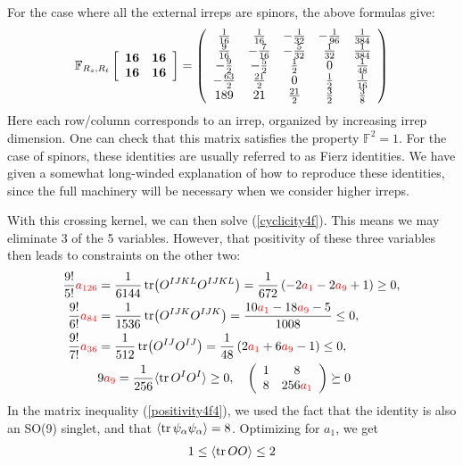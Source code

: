 \documentclass[11pt]{article}
\def\nref#1{(\ref{#1})}
\renewcommand{\ev}[1]{\langle #1 \rangle} %
\def\red{\color{red}}
\begin{document}
For the case where all the external irreps are spinors, the above formulas give: %
\begin{align}
  \mathbb{F}_{R_s, R_t}\left[\begin{array}{ll}
{\bf 16} & {\bf 16} \\
{\bf 16} & {\bf 16}
\end{array}\right] = \left(
\begin{array}{ccccc}
 \frac{1}{16} & \frac{1}{16} & -\frac{1}{32} & -\frac{1}{96} & \frac{1}{384} \\
 \frac{9}{16} & -\frac{7}{16} & -\frac{5}{32} & \frac{1}{32} & \frac{1}{384} \\
 -\frac{9}{2} & -\frac{5}{2} & \frac{1}{2} & 0 & \frac{1}{48} \\
 -\frac{63}{2} & \frac{21}{2} & 0 & \frac{1}{2} & \frac{1}{16} \\
 189 & 21 & \frac{21}{2} & \frac{3}{2} & \frac{3}{8} \\
\end{array}
\right)
\end{align}
Here each row/column corresponds to an irrep, organized by increasing irrep dimension.
One can check that this matrix satisfies the property $\mathbb{F}^2 = 1$.
For the case of spinors, these identities are usually referred to as Fierz identities. We have given a somewhat long-winded explanation of how to reproduce these identities, since the full machinery will be necessary when we consider higher irreps.

With this crossing kernel, we can then solve \nref{cyclicity4f}. This means we may eliminate 3 of the 5 variables. However, that positivity of these three variables then leads to constraints on the other two:
\begin{align} \label{positivity4f1}
\frac{9!}{5!} {\red a_{126}} &= \frac{1}{6144} \tr (O^{IJKL} O^{IJKL}) = \frac{1}{672} \left(-2 {\red a_1}-2 {\red a_9}+1\right) \ge 0,\\ \label{positivity4f2}
{\frac{9!}{6!}\red a_{84}} &=  \frac{1}{1536} \tr (O^{IJK} O^{IJK}) = \frac{10 {\red a_1}-18 {\red a_9}-5}{1008} \le 0,\\ \label{positivity4f3}
{\frac{9!}{7!}\red a_{36}} &= \frac{1}{512}\tr (O^{IJ} O^{IJ}) = \frac{1}{48} \left(2 {\red a_1}+6 {\red a_9}-1\right) \le 0,\\ \label{positivity4f4}
& 9 {\red a_9} = \frac{1}{256}  \ev{\tr O^I O^I} \ge 0, \quad \left(
\begin{array}{cc}
 1 & 8 \\
 8 & 256 {\red a_1} \\
\end{array}
\right) \succeq 0  
\end{align}
In the matrix inequality \nref{positivity4f4}, we used the fact that the identity is also an SO(9) singlet, and that $\ev{\tr \psi_\alpha \psi_\alpha} = 8$.
Optimizing for $a_1$, we get 
\begin{align} \label{level6bd}
    1 \le \ev{\tr O O} \le 2
\end{align}
\end{document}
